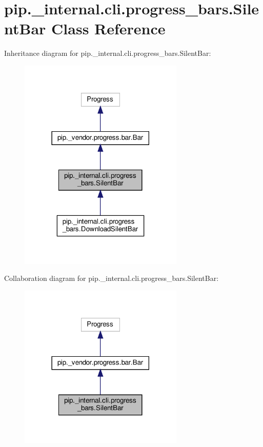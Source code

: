 \hypertarget{classpip_1_1__internal_1_1cli_1_1progress__bars_1_1SilentBar}{}\section{pip.\+\_\+internal.\+cli.\+progress\+\_\+bars.\+Silent\+Bar Class Reference}
\label{classpip_1_1__internal_1_1cli_1_1progress__bars_1_1SilentBar}


Inheritance diagram for pip.\+\_\+internal.\+cli.\+progress\+\_\+bars.\+Silent\+Bar\+:
\nopagebreak
\begin{figure}[H]
\begin{center}
\leavevmode
\includegraphics[width=222pt]{classpip_1_1__internal_1_1cli_1_1progress__bars_1_1SilentBar__inherit__graph}
\end{center}
\end{figure}


Collaboration diagram for pip.\+\_\+internal.\+cli.\+progress\+\_\+bars.\+Silent\+Bar\+:
\nopagebreak
\begin{figure}[H]
\begin{center}
\leavevmode
\includegraphics[width=222pt]{classpip_1_1__internal_1_1cli_1_1progress__bars_1_1SilentBar__coll__graph}
\end{center}
\end{figure}
